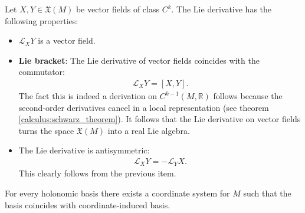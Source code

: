     \begin{property}
        Let $X, Y\in\mathfrak{X}(M)$ be vector fields of class $C^k$. The Lie derivative has the following properties:
        \begin{itemize}
            \item $\mathcal{L}_XY$ is a vector field.
            \item \textbf{Lie bracket}: The Lie derivative of vector fields coincides with the commutator:
                \begin{gather}
                    \label{manifolds:lie_bracket}
                    \mathcal{L}_XY = [X, Y].
                \end{gather}
                The fact this is indeed a derivation on $C^{k-1}(M, \mathbb{R})$ follows because the second-order derivatives cancel in a local representation (see theorem \ref{calculus:schwarz_theorem}). It follows that the Lie derivative on vector fields turns the space $\mathfrak{X}(M)$ into a real Lie algebra.
            \item The Lie derivative is antisymmetric:
                \begin{gather}
                    \label{diff:lie_derivative_antisymmetry}
                    \mathcal{L}_XY = -\mathcal{L}_YX.
                \end{gather}
                This clearly follows from the previous item.
        \end{itemize}
    \end{property}

    \begin{property}
        For every holonomic basis there exists a coordinate system for $M$ such that the basis coincides with coordinate-induced basis.
    \end{property}

